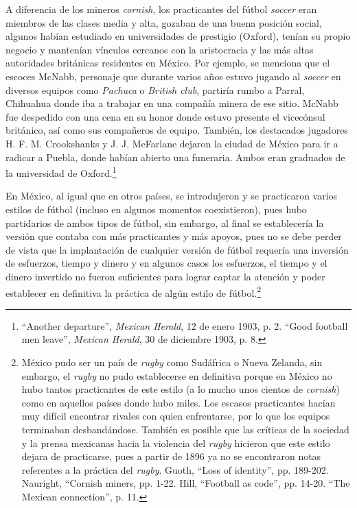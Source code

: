 \documentclass[11pt,a5paper,twoside]{book} %
\begin{document}
A diferencia de los mineros \emph{cornish}, los practicantes del fútbol \emph{soccer} eran miembros de las clases media y alta, gozaban de una buena posición social, algunos habían estudiado en universidades de prestigio (Oxford), tenían su propio negocio y mantenían vínculos cercanos con la aristocracia y las más altas autoridades británicas residentes en México. Por ejemplo, se menciona que el escoces McNabb, personaje que durante varios años estuvo jugando al \emph{soccer} en diversos equipos como \emph{Pachuca} o \emph{British club}, partiría rumbo a Parral, Chihuahua donde iba a trabajar en una compañía minera de ese sitio. McNabb fue despedido con una cena en su honor donde estuvo presente el vicecónsul británico, así como sus compañeros de equipo. También, los destacados jugadores H. F. M. Crookshanks y J. J. McFarlane dejaron la ciudad de México para ir a radicar a Puebla, donde habían abierto una funeraria. Ambos eran graduados de la universidad de Oxford.\footnote{``Another departure'', \emph{Mexican Herald}, 12 de enero 1903, p. 2. ``Good football men leave'', \emph{Mexican Herald}, 30 de diciembre 1903, p. 8.}

En México, al igual que en otros países, se introdujeron y se practicaron varios estilos de fútbol (incluso en algunos momentos coexistieron), pues hubo partidarios de ambos tipos de fútbol, sin embargo, al final se establecería la versión que contaba con más practicantes y más apoyos, pues no se debe perder de vista que la implantación de cualquier versión de fútbol requería una inversión de esfuerzos, tiempo y dinero y en algunos casos los esfuerzos, el tiempo y el dinero invertido no fueron suficientes para lograr captar la atención y poder establecer en definitiva la práctica de algún estilo de fútbol.\footnote{México pudo ser un país de \emph{rugby} como Sudáfrica o Nueva Zelanda, sin embargo, el \emph{rugby} no pudo establecerse en definitiva porque en México no hubo tantos practicantes de este estilo (a lo mucho unos cientos de \emph{cornish}) como en aquellos países donde hubo miles. Los escasos practicantes hacían muy difícil encontrar rivales con quien enfrentarse, por lo que los equipos terminaban desbandándose. También es posible que las críticas de la sociedad y la prensa mexicanas hacia la violencia del \emph{rugby} hicieron que este estilo dejara de practicarse, pues a partir de 1896 ya no se encontraron notas referentes a la práctica del \emph{rugby}. Guoth, ``Loss of identity'', pp. 189-202. Nauright, ``Cornish miners, pp. 1-22. Hill, ``Football as code'', pp. 14-20. ``The Mexican connection'', p. 11.}
\end{document}
